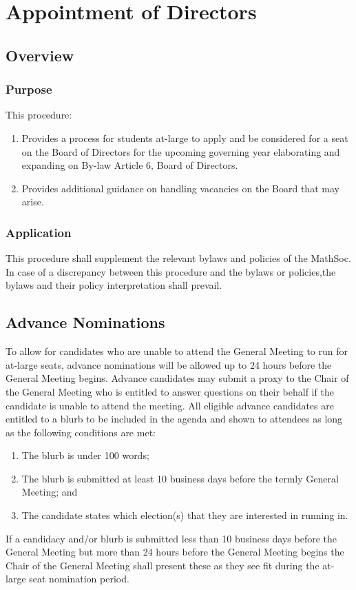 \section{Appointment of Directors}
\subsection{Overview}
\subsubsection{Purpose}
This procedure:
\begin{enumerate}
    \item Provides a process for students at-large to apply and be considered for a seat on the 
        Board of Directors for the upcoming governing year elaborating and expanding on By-law Article 6, 
        Board of Directors.
    \item Provides additional guidance on handling vacancies on the Board that may arise. 
\end{enumerate}

\subsubsection{Application}
This procedure shall supplement the relevant bylaws and policies of the MathSoc. 
In case of a discrepancy between this procedure and the bylaws or policies,the bylaws and their policy interpretation shall prevail.



\subsection{Advance Nominations}
To allow for candidates who are unable to attend the General Meeting to run for at-large seats, advance nominations will be allowed up to 24 hours before the General Meeting begins. 
Advance candidates may submit a proxy to the Chair of the General Meeting who is entitled to answer questions on their behalf if the candidate is unable to attend the meeting. 
All eligible advance candidates are entitled to a blurb to be included in the agenda and shown to attendees  as long as the following conditions are met: 
\begin{enumerate}
    \item The blurb is under 100 words; 
    \item The blurb is submitted at least 10 business days before the termly General Meeting; and
    \item The candidate states which election(s) that they are interested in running in.
\end{enumerate}
If a candidacy and/or blurb is submitted less than 10 business days before the General Meeting but more than 24 hours before the General Meeting begins the Chair of the General Meeting shall present these as they see fit during the at-large seat nomination period. 

